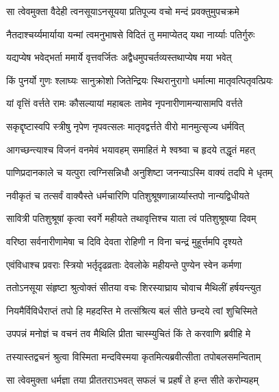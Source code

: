 
\twolineshloka
{सा त्वेवमुक्ता वैदेही त्वनसूयाऽनसूयया}
{प्रतिपूज्य वचो मन्दं प्रवक्तुमुपचक्रमे} %

\twolineshloka
{नैतदाश्चर्य्यमार्याया यन्मां त्वमनुभाषसे}
{विदितं तु ममाप्येतद् यथा नार्य्याः पतिर्गुरुः} %

\twolineshloka
{यद्यप्येष भवेद्भर्ता ममार्ये वृत्तवर्जितः}
{अद्वैधमुपचर्तव्यस्तथाप्येष मया भवेत्} %

\twolineshloka
{किं पुनर्यो गुणः श्लाघ्यः सानुक्रोशो जितेन्द्रियः}
{स्थिरानुरागो धर्मात्मा मातृवत्पितृवत्प्रियः} %

\twolineshloka
{यां वृत्तिं वर्त्तते रामः कौसल्यायां महाबलः}
{तामेव नृपनारीणामन्यासामपि वर्त्तते} %

\twolineshloka
{सकृद्दृष्टास्वपि स्त्रीषु नृपेण नृपवत्सलः}
{मातृवद्वर्त्तते वीरो मानमुत्सृज्य धर्मवित्} %

\twolineshloka
{आगच्छन्त्याश्च विजनं वनमेवं भयावहम्}
{समाहितं मे श्वश्र्वा च हृदये तद्धृतं महत्} %

\twolineshloka
{पाणिप्रदानकाले च यत्पुरा त्वग्निसन्निधौ}
{अनुशिष्टा जनन्याऽस्मि वाक्यं तदपि मे धृतम्} %

\twolineshloka
{नवीकृतं च तत्सर्वं वाक्यैस्ते धर्मचारिणि}
{पतिशुश्रूषणान्नार्य्यास्तपो नान्यद्विधीयते} %

\twolineshloka
{सावित्री पतिशुश्रूषां कृत्वा स्वर्गे महीयते}
{तथावृत्तिश्च याता त्वं पतिशुश्रूषया दिवम्} %

\twolineshloka
{वरिष्ठा सर्वनारीणामेषा च दिवि देवता}
{रोहिणी न विना चन्द्रं मुहूर्त्तमपि दृश्यते} %

\twolineshloka
{एवंविधाश्च प्रवराः स्त्रियो भर्तृदृढव्रताः}
{देवलोके महीयन्ते पुण्येन स्वेन कर्मणा} %

\twolineshloka
{ततोऽनसूया संहृष्टा श्रुत्वोक्तं सीतया वचः}
{शिरस्याघ्राय चोवाच मैथिलीं हर्षयन्त्युत} %

\twolineshloka
{नियमैर्विविधैराप्तं तपो हि महदस्ति मे}
{तत्संश्रित्य बलं सीते छन्दये त्वां शुचिस्मिते} %

\twolineshloka
{उपपन्नं मनोज्ञं च वचनं तव मैथिलि}
{प्रीता चास्म्युचितं किं ते करवाणि ब्रवीहि मे} %

\onelineshloka
{तस्यास्तद्वचनं श्रुत्वा विस्मिता मन्दविस्मया कृतमित्यब्रवीत्सीता तपोबलसमन्विताम्} %

\twolineshloka
{सा त्वेवमुक्ता धर्मज्ञा तया प्रीततराऽभवत्}
{सफलं च प्रहर्षं ते हन्त सीते करोम्यहम्} %


